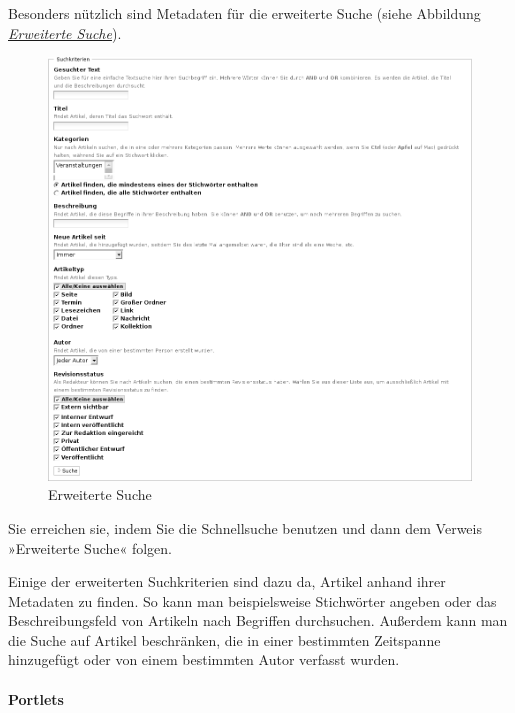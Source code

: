 \documentclass[a4paper,12pt,ngerman]{manual}
\begin{document}
Besonders nützlich sind Metadaten für die erweiterte Suche
(siehe Abbildung \hyperlink{fig-erweiterte-suche}{\emph{Erweiterte Suche}}).
\hypertarget{fig-erweiterte-suche}{}\begin{figure}[htbp]
\centering

\includegraphics[width=1.000\linewidth]{erweiterte-suche.png}
\caption{Erweiterte Suche}\end{figure}

Sie erreichen sie, indem Sie die Schnellsuche benutzen und dann dem Verweis
»Erweiterte Suche« folgen.

Einige der erweiterten Suchkriterien sind dazu da, Artikel anhand ihrer
Metadaten zu finden. So kann man beispielsweise Stichwörter angeben oder das
Beschreibungsfeld von Artikeln nach Begriffen durchsuchen. Außerdem kann man
die Suche auf Artikel beschränken, die in einer bestimmten Zeitspanne
hinzugefügt oder von einem bestimmten Autor verfasst wurden.
\hypertarget{sec-nutz-von-metad-3}{}

\paragraph{Portlets}
\end{document}
